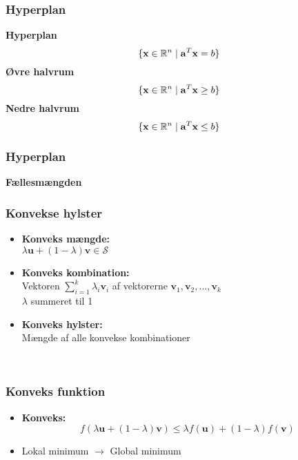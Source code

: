 \begin{frame}
\frametitle{Hyperplan}
\textbf{Hyperplan}
$$\{\textbf{x} \in \mathbb{R}^n \mid \mathbf{a}^T \mathbf{x}=b\}$$ 
%
\textbf{Øvre halvrum}
$$\{\textbf{x} \in \mathbb{R}^n \mid \mathbf{a}^T \mathbf{x} \geq b\}$$ 
\textbf{Nedre halvrum}
$$\{\textbf{x} \in \mathbb{R}^n \mid \mathbf{a}^T \mathbf{x} \leq b\}$$ 
\end{frame}

\begin{frame}
\frametitle{Hyperplan}
\textbf{Fællesmængden}

\end{frame}


\begin{frame}
\frametitle{Konvekse hylster }
\begin{itemize}
\item \textbf{Konveks mængde: } \\
$\lambda \textbf{u} + (1- \lambda ) \textbf{v} \in \mathcal{S}$
\item \textbf{Konveks kombination: } \\ 
Vektoren $\sum_{i=1}^{k} \lambda_i \textbf{v}_i$ af vektorerne $\textbf{v}_1, \textbf{v}_2, \ldots, \textbf{v}_k$ 
\\ $\lambda$ summeret til 1
\item \textbf{Konveks hylster: } \\
Mængde af alle konvekse kombinationer \\
\end{itemize}
\phantom{H} \\

\end{frame}

\begin{frame}
\frametitle{Konveks funktion}
\begin{itemize}
	\item \textbf{Konveks:} 
	$$f(\lambda \textbf{u} + (1- \lambda ) \textbf{v}) \leq \lambda f( \textbf{u}) + (1- \lambda ) f(\textbf{v}) $$ 
\end{itemize}

\begin{itemize}
\item Lokal minimum $\rightarrow$ Global minimum
\end{itemize}
\phantom{H} \\
\phantom{H} \\
\end{frame}



